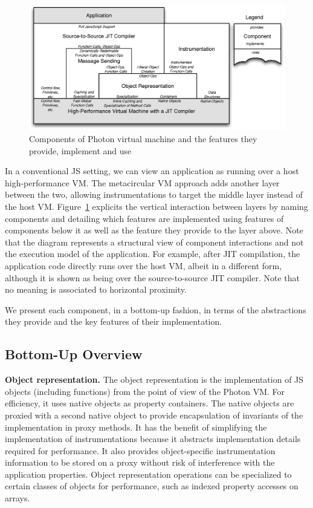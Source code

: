 \begin{figure}[htb]
\begin{center}
\includegraphics[width=1.0\textwidth]{figures/architecture}
\caption{\label{fig:Architecture} Components of Photon virtual machine
and the features they provide, implement and use}
\end{center}
\end{figure}

In a conventional JS setting, we can view an application as running over a host
high-performance VM. The metacircular VM approach adds another layer between
the two, allowing instrumentations to target the middle layer instead of the
host VM.  Figure~\ref{fig:Architecture} explicits the vertical interaction
between layers by naming components and detailing which features are
implemented using features of components below it as well as the feature they
provide to the layer above. Note that the diagram represents a structural view
of component interactions and not the execution model of the application. For
example, after JIT compilation, the application code directly runs over the
host VM, albeit in a different form, although it is shown as being over the
source-to-source JIT compiler.  Note that no meaning is associated to
horizontal proximity.

We present each component, in a bottom-up fashion, in terms of the abstractions
they provide and the key features of their implementation. 

\subsection{Bottom-Up Overview}

\textbf{Object representation.} The object representation is the implementation
of JS objects (including functions) from the point of view of the Photon VM.
For efficiency, it uses native objects as property containers. The native
objects are proxied with a second native object to provide encapsulation of
invariants of the implementation in proxy methods. It has the benefit of
simplifying the implementation of instrumentations because it abstracts
implementation details required for performance. It also provides object-specific
instrumentation information to be stored on a proxy without risk of
interference with the application properties.  Object representation operations
can be specialized to certain classes of objects for performance, such as
indexed property accesses on arrays.

